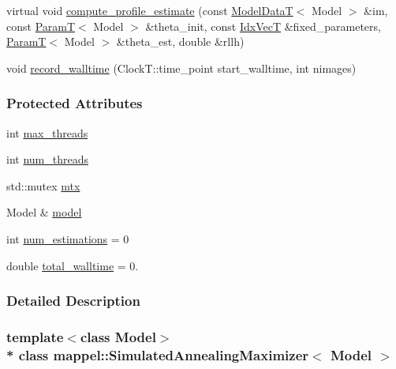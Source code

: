 \begin{DoxyCompactItemize}
virtual void \hyperlink{classmappel_1_1Estimator_a273f65624e06688cd4b1126e3e7556ae}{compute\+\_\+profile\+\_\+estimate} (const \hyperlink{namespacemappel_a97f050df953605381ae9c901c3b125f1}{Model\+DataT}$<$ Model $>$ \&im, const \hyperlink{namespacemappel_a667925cb0d6c0e49f2f035cc5a9a6857}{ParamT}$<$ Model $>$ \&theta\+\_\+init, const \hyperlink{namespacemappel_ac63743dcd42180127307cd0e4ecdd784}{Idx\+VecT} \&fixed\+\_\+parameters, \hyperlink{namespacemappel_a667925cb0d6c0e49f2f035cc5a9a6857}{ParamT}$<$ Model $>$ \&theta\+\_\+est, double \&rllh)
\item 
void \hyperlink{classmappel_1_1Estimator_a50125572d3b87ebcf1ffb27a8d8c643d}{record\+\_\+walltime} (Clock\+T\+::time\+\_\+point start\+\_\+walltime, int nimages)
\end{DoxyCompactItemize}
\subsubsection*{Protected Attributes}
\begin{DoxyCompactItemize}
\item 
int \hyperlink{classmappel_1_1ThreadedEstimator_a31391f8aaab3484f58bfdedbdb22be42}{max\+\_\+threads}
\item 
int \hyperlink{classmappel_1_1ThreadedEstimator_a6afa05d7d971f3317ce1602de853123b}{num\+\_\+threads}
\item 
std\+::mutex \hyperlink{classmappel_1_1ThreadedEstimator_a4538fd0860243430bfd47e8064c8cfe4}{mtx}
\item 
Model \& \hyperlink{classmappel_1_1Estimator_a8322546d87ccdf01f8b0dcd9dae509f0}{model}
\item 
int \hyperlink{classmappel_1_1Estimator_ab15b88435d6c50a68fac84465d950b12}{num\+\_\+estimations} = 0
\item 
double \hyperlink{classmappel_1_1Estimator_a5a408458a111c5222193871fa6bb6644}{total\+\_\+walltime} = 0.
\end{DoxyCompactItemize}


\subsubsection{Detailed Description}
\subsubsection*{template$<$class Model$>$\\*
class mappel\+::\+Simulated\+Annealing\+Maximizer$<$ Model $>$}



